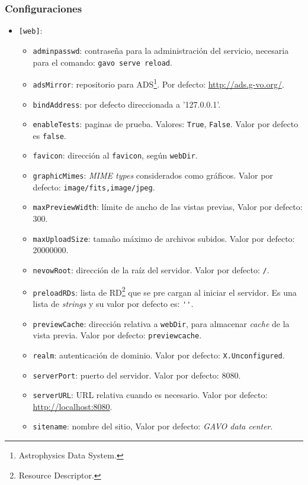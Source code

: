 \subsubsection*{Configuraciones}

\begin{itemize}
	\item \verb;[web];:
		\begin{itemize}
			\item \verb;adminpasswd;: contraseña para la administración del servicio, necesaria para el comando: \verb;gavo serve reload;.
			\item \verb;adsMirror;: repositorio para ADS\footnote{Astrophysics Data System.}. Por defecto: \url{http://ads.g-vo.org/}.
			\item \verb;bindAddress;: por defecto direccionada a  '127.0.0.1'.
			\item \verb;enableTests;: paginas de prueba. Valores: \verb;True;, \verb;False;. Valor por defecto es \verb;false;.
			\item \verb;favicon;: dirección al \verb;favicon;, según \verb;webDir;.
			\item \verb;graphicMimes;: \emph{MIME types} considerados como gráficos. Valor por defecto: \verb;image/fits,image/jpeg;.
			\item \verb;maxPreviewWidth;: límite de ancho de las vistas previas, Valor por defecto: 300.
			\item \verb;maxUploadSize;: tamaño máximo de archivos subidos. Valor por defecto: 20000000.
			\item \verb;nevowRoot;: dirección de la raíz del servidor. Valor por defecto: \verb;/;.
			\item \verb;preloadRDs;: lista de RD\footnote{Resource Descriptor.} que se pre cargan al iniciar el servidor. Es una lista de \emph{strings} y su valor por defecto es: \verb;'';.
			\item \verb;previewCache;: dirección relativa a \verb;webDir;, para almacenar \emph{cache} de la vista previa. Valor por defecto: \verb;previewcache;.
			\item \verb;realm;: autenticación de dominio. Valor por defecto: \verb;X.Unconfigured;.
			\item \verb;serverPort;: puerto del servidor. Valor por defecto: 8080.
			\item \verb;serverURL;: URL relativa cuando es necesario. Valor por defecto: \url{http://localhost:8080}.
			\item \verb;sitename;: nombre del sitio, Valor por defecto: \emph{GAVO data center}.

\end{itemize}
\end{itemize}
